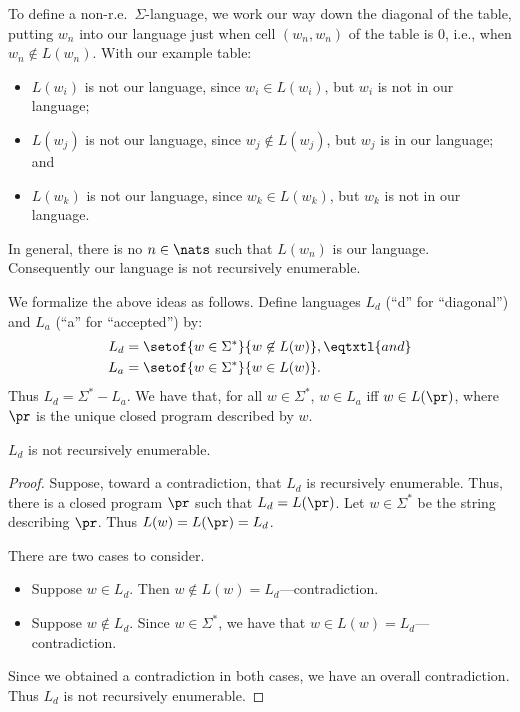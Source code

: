 To define a non-r.e.\ $\Sigma$-language, we work our way down the diagonal of
the table, putting $w_n$ into our language just when cell $(w_n,w_n)$
of the table is $0$, i.e., when $w_n\not\in L(w_n)$.
With our example table:
\begin{itemize}
\item $L(w_i)$ is not our language, since $w_i\in L(w_i)$, but $w_i$
  is not in our language;

\item $L(w_j)$ is not our language, since $w_j\not\in L(w_j)$, but
  $w_j$ is in our language; and

\item $L(w_k)$ is not our language, since $w_k\in L(w_k)$, but $w_k$
  is not in our language.
\end{itemize}
In general, there is no $n\in\nats$ such that $L(w_n)$ is our
language.  Consequently our language is not recursively enumerable.

We formalize the above ideas as follows.  Define languages
$L_d$ (``d'' for ``diagonal'') and $L_a$ (``a'' for ``accepted'') by:
\begin{align*}
L_d &= \setof{w\in\Sigma^*}{w\not\in L(w)} , \eqtxtl{and} \\
L_a &= \setof{w\in\Sigma^*}{w\in L(w)} .
\end{align*}
Thus $L_d = \Sigma^* - L_a$.
We have that, for all $w\in\Sigma^*$, $w\in L_a$ iff $w\in L(\pr)$,
where $\pr$ is the unique closed program described by $w$.

\begin{theorem}
$L_d$ is not recursively enumerable.
\end{theorem}

\begin{proof}
Suppose, toward a contradiction, that $L_d$ is recursively
enumerable.  Thus, there is a closed program $\pr$ such that
$L_d=L(\pr)$.  Let $w\in\Sigma^*$ be the string describing $\pr$.
Thus $L(w)=L(\pr)=L_d$.

There are two cases to consider.
\begin{itemize}
\item Suppose $w\in L_d$.  Then $w\not\in L(w)=L_d$---contradiction.

\item Suppose $w\not\in L_d$.  Since $w\in\Sigma^*$, we have that
  $w\in L(w)=L_d$---contradiction.
\end{itemize}
Since we obtained a contradiction in both cases, we have an
overall contradiction.  Thus $L_d$ is not recursively enumerable.
\end{proof}

